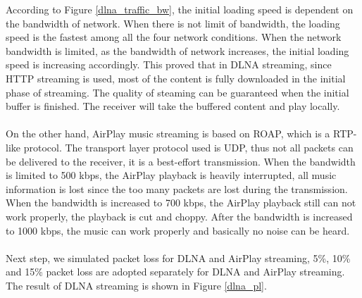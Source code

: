 According to Figure \ref{dlna_traffic_bw}, the initial loading speed is dependent on the bandwidth of network. When there is not limit of bandwidth, the loading speed is the fastest among all the four network conditions. When the network bandwidth is limited, as the bandwidth of network increases, the initial loading speed is increasing accordingly. This proved that in DLNA streaming, since HTTP streaming is used, most of the content is fully downloaded in the initial phase of streaming. The quality of steaming can be guaranteed when the initial buffer is finished. The receiver will take the buffered content and play locally.\\
\\
On the other hand, AirPlay music streaming is based on ROAP, which is a RTP-like protocol. The transport layer protocol used is UDP, thus not all packets can be delivered to the receiver, it is a best-effort transmission. When the bandwidth is limited to 500 kbps, the AirPlay playback is heavily interrupted, all music information is lost since the too many packets are lost during the transmission. When the bandwidth is increased to 700 kbps, the AirPlay playback still can not work properly, the playback is cut and choppy. After the bandwidth is increased to 1000 kbps, the music can work properly and basically no noise can be heard.\\
\\
Next step, we simulated packet loss for DLNA and AirPlay streaming, 5\%, 10\% and 15\% packet loss are adopted separately for DLNA and AirPlay streaming. The result of DLNA streaming is shown in Figure \ref{dlna_pl}. 
